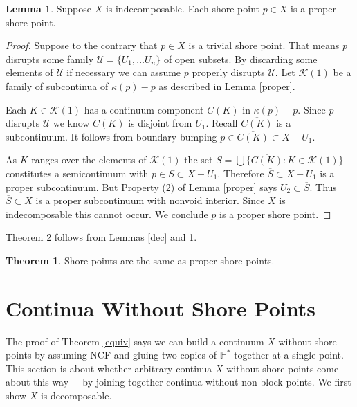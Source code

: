 \documentclass[12pt]{article}
\theoremstyle{plain}
\theoremstyle{definition}
\newtheorem{lemma}[theorem]{Lemma}
\newcounter{dummy}
\newcounter{dummy4}
\newcounter{dummy3}
\newtheorem{thm3}[dummy3]{Theorem}
\newcounter{dummy5}
\newcounter{dummy6}
\newcommand{\K}{\ensuremath{\kappa}}
\newcommand{\HH}{\ensuremath{\mathbb H}}
\newcommand{\0}{\ensuremath{\varnothing}}
\newcommand{\cK}{\ensuremath{\mathcal K}}
\newcommand{\cU}{\ensuremath{\mathcal U}}
\begin{document}
\begin{lemma}\label{indec}
Suppose $X$ is indecomposable. Each shore point $p \in X$ is a proper shore point.
\end{lemma}

\begin{proof}
Suppose to the contrary that $p \in X$ is a trivial shore point.
That means $p$ disrupts some family $\cU = \{U_1, \ldots U_n\}$ of open subsets.
By discarding some elements of $\cU$ if necessary we can assume $p$ properly disrupts $\cU$.
Let $\cK(1)$ be a family of subcontinua of $ \K(p)-p$ as described in Lemma \ref{proper}.

Each $K \in \cK(1)$ has a continuum component $C(K)$ in $\K(p)-p$.
Since $p$ disrupts $\cU$ we know $C(K)$ is disjoint from $U_1$.
Recall $\overline {C(K)}$ is a subcontinuum.
It follows from boundary bumping $p \in \overline {C(K)} \subset X - U_1$.

As $K$ ranges over the elements of $\cK(1)$ the set $S = \bigcup \big \{\overline {C(K)}: K \in \cK(1) \big \}$ constitutes a semicontinuum with $p \in S \subset X - U_1$.
Therefore \mbox{$\overline S \subset X-U_1$} is a proper subcontinuum.
But Property (2) of Lemma \ref{proper} says $U_2 \subset \overline S$.
Thus \mbox{$\overline S \subset X$} is a proper subcontinuum with nonvoid interior.
Since $X$ is indecomposable this cannot occur. We conclude $p$ is a proper shore point.
\end{proof}

Theorem 2 follows from Lemmas \ref{dec} and \ref{indec}.

\begin{thm3}\label{theorem2}
Shore points are the same as proper shore points.
\end{thm3}


\section{Continua Without Shore Points}

\noindent 
The proof of Theorem \ref{equiv} says we can build a continuum $X$ without shore points by assuming
NCF and gluing two copies of $\HH^*$ together at a single point.
This section is about whether arbitrary continua $X$ without shore points come about this way 
$-$ by joining together continua without non-block points.
We first show $X$ is decomposable.


\end{document}
